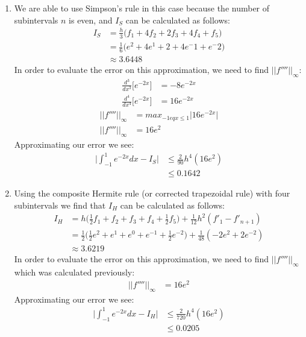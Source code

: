 \documentclass[11pt,a4paper]{article}
\begin{document}
\begin{itemize}
\begin{enumerate} [label={\alph*)}]
					\item We are able to use Simpson's rule in this case because the number of subintervals $n$ is even, and $I_S$ can be calculated as follows:
					\begin{align*}
						I_S &= \frac{h}{3}\Big(f_1 + 4f_2 + 2f_3 + 4f_4 + f_5 \Big) \\
							&= \frac{1}{6}\Big(e^2 + 4e^1 + 2 + 4e^-1 + e^-2 \Big) \\
							&\approx 3.6448
					\end{align*}
					In order to evaluate the error on this approximation, we need to find $\vert \vert f'''' \vert \vert_\infty$:
					\begin{align*}
					\frac{d^3}{dx^3}\Big[e^{-2x}\Big]  &= -8e^{-2x}  \\
					\frac{d^4}{dx^4}\Big[e^{-2x}\Big]  &= 16e^{-2x}
					\end{align*}
					\begin{align*}
					\vert \vert f'''' \vert \vert_\infty &= max_{-1eq x\leq 1} \vert 16e^{-2x} \vert\\
					\vert \vert f'''' \vert \vert_\infty &= 16e^2
					\end{align*}
					Approximating our error we see:
					\begin{align*}
					\Biggl \vert \int_{-1}^{1}e^{-2x}dx - I_S \Biggl\vert &\leq \frac{2}{90}h^4(16e^2) \\
					&\leq 0.1642
					\end{align*}
					
					\item Using the composite Hermite rule (or corrected trapezoidal rule) with four subintervals we find that $I_H$ can be calculated as follows:
					\begin{align*}
					I_H &= h\Big( \frac{1}{2}f_1 + f_2 + f_3 + f_4 + \frac{1}{2}f_5 \Big) + \frac{1}{12}h^2 (f'_1 - f'_{n+1}) \\
					&= \frac{1}{2}\Big( \frac{1}{2}e^2 + e^1 + e^0 + e^{-1} + \frac{1}{2}e^{-2} \Big) + \frac{1}{48}(-2e^{2} + 2e^{-2})\\
					&\approx 3.6219
					\end{align*}
					In order to evaluate the error on this approximation, we need to find $\vert \vert f'''' \vert \vert_\infty$ which was calculated previously:
					\begin{align*}
					\vert \vert f'''' \vert \vert_\infty &= 16e^2
					\end{align*}
					Approximating our error we see:
					\begin{align*}
					\Biggl \vert \int_{-1}^{1}e^{-2x}dx - I_H \Biggl\vert &\leq \frac{2}{720}h^4 (16e^2) \\
					&\leq 0.0205
					\end{align*}
					

\end{enumerate}
\end{itemize}
\end{document}
